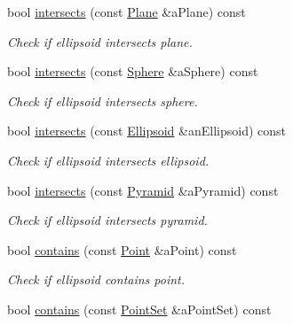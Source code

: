 \begin{DoxyCompactItemize}
bool \hyperlink{classlibrary_1_1math_1_1geom_1_1d3_1_1objects_1_1_ellipsoid_ada79a3cf3bf68843a8313eb914c21a95}{intersects} (const \hyperlink{classlibrary_1_1math_1_1geom_1_1d3_1_1objects_1_1_plane}{Plane} \&a\+Plane) const
\begin{DoxyCompactList}\small\item\em Check if ellipsoid intersects plane. \end{DoxyCompactList}\item 
bool \hyperlink{classlibrary_1_1math_1_1geom_1_1d3_1_1objects_1_1_ellipsoid_aa9d3833e3d2be95ff00d7af32fe9b15e}{intersects} (const \hyperlink{classlibrary_1_1math_1_1geom_1_1d3_1_1objects_1_1_sphere}{Sphere} \&a\+Sphere) const
\begin{DoxyCompactList}\small\item\em Check if ellipsoid intersects sphere. \end{DoxyCompactList}\item 
bool \hyperlink{classlibrary_1_1math_1_1geom_1_1d3_1_1objects_1_1_ellipsoid_a4dfd1a3feba0ebed8a5adf89120ce53c}{intersects} (const \hyperlink{classlibrary_1_1math_1_1geom_1_1d3_1_1objects_1_1_ellipsoid}{Ellipsoid} \&an\+Ellipsoid) const
\begin{DoxyCompactList}\small\item\em Check if ellipsoid intersects ellipsoid. \end{DoxyCompactList}\item 
bool \hyperlink{classlibrary_1_1math_1_1geom_1_1d3_1_1objects_1_1_ellipsoid_a05dc13a49a72cb23046ff5735072765b}{intersects} (const \hyperlink{classlibrary_1_1math_1_1geom_1_1d3_1_1objects_1_1_pyramid}{Pyramid} \&a\+Pyramid) const
\begin{DoxyCompactList}\small\item\em Check if ellipsoid intersects pyramid. \end{DoxyCompactList}\item 
bool \hyperlink{classlibrary_1_1math_1_1geom_1_1d3_1_1objects_1_1_ellipsoid_ae54cb74c4e6445988ac4d78e00288dd2}{contains} (const \hyperlink{classlibrary_1_1math_1_1geom_1_1d3_1_1objects_1_1_point}{Point} \&a\+Point) const
\begin{DoxyCompactList}\small\item\em Check if ellipsoid contains point. \end{DoxyCompactList}\item 
bool \hyperlink{classlibrary_1_1math_1_1geom_1_1d3_1_1objects_1_1_ellipsoid_af539fe9e2be122e3f994a48e7d308fd0}{contains} (const \hyperlink{classlibrary_1_1math_1_1geom_1_1d3_1_1objects_1_1_point_set}{Point\+Set} \&a\+Point\+Set) const

\end{DoxyCompactItemize}
